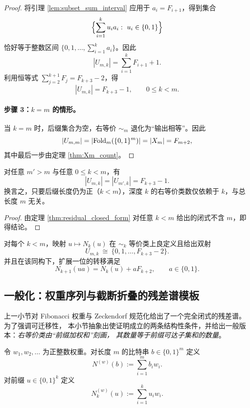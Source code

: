 \begin{proof}
将引理 \ref{lem:subset_sum_interval} 应用于 $a_i=F_{i+1}$，得到集合
\[
\Bigl\{\sum_{i=1}^k u_i a_i:\ u_i\in\{0,1\}\Bigr\}
\]
恰好等于整数区间 $\{0,1,\dots,\sum_{i=1}^k a_i\}$。因此
\[
|U_{m,k}|=\sum_{i=1}^{k} F_{i+1}+1.
\]
利用恒等式 $\sum_{j=2}^{k+1} F_j=F_{k+3}-2$，得
\[
|U_{m,k}|=F_{k+3}-1,\qquad 0\le k<m.
\]

\paragraph{步骤 3：$k=m$ 的情形。}
当 $k=m$ 时，后缀集合为空，右等价 $\sim_m$ 退化为“输出相等”。因此
\[
|U_{m,m}|=|\mathrm{Fold}_m(\{0,1\}^m)|=|X_m|=F_{m+2},
\]
其中最后一步由定理 \ref{thm:Xm_count}。
\end{proof}

\begin{corollary}\label{cor:prefix_stability}
对任意 $m'>m$ 与任意 $0\le k<m$，有
\[
|U_{m,k}|=|U_{m',k}|=F_{k+3}-1.
\]
换言之，只要后缀长度仍为正（$k<m$），深度 $k$ 的右等价类数仅依赖于 $k$，与总长度 $m$ 无关。
\end{corollary}
\begin{proof}
由定理 \ref{thm:residual_closed_form} 对任意 $k<m$ 给出的闭式不含 $m$，即得结论。
\end{proof}

\begin{corollary}[显式最小状态表示]\label{cor:explicit_state}
对每个 $k<m$，映射 $u\mapsto N_k(u)$ 在 $\sim_k$ 等价类上良定义且给出双射
\[
U_{m,k}\ \cong\ \{0,1,\dots,F_{k+3}-2\}.
\]
并且在该同构下，扩展一位的转移满足
\[
N_{k+1}(ua)=N_k(u)+aF_{k+2},\qquad a\in\{0,1\}.
\]
\end{corollary}

\subsection{一般化：权重序列与截断折叠的残差谱模板}
上一小节对 Fibonacci 权重与 Zeckendorf 规范化给出了一个完全闭式的残差谱。为了强调可迁移性，
本小节抽象出使证明成立的两条结构性条件，并给出一般版本：\emph{右等价类由“前缀加权和”刻画，
其数量等于前缀可达子集和的数量}。

\begin{definition}[一般权重与加权和]
令 $w_1,w_2,\dots$ 为正整数权重。对长度 $m$ 的比特串 $b\in\{0,1\}^m$ 定义
\[
N^{(w)}(b):=\sum_{i=1}^{m} b_i w_i.
\]
对前缀 $u\in\{0,1\}^k$ 定义
\[
N^{(w)}_k(u):=\sum_{i=1}^{k} u_i w_i.
\]
\end{definition}

